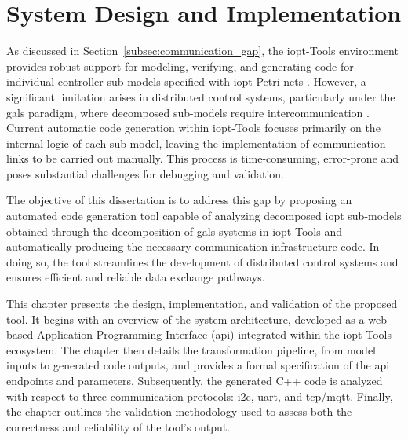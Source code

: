 
%

\chapter{System Design and Implementation}
\label{cha:chap_3}


As discussed in Section~\ref{subsec:communication_gap}, the \gls{iopt}-Tools environment provides robust support for modeling, verifying, and generating code for individual controller sub-models specified with \gls{iopt} Petri nets \cite{iopttools, barros2004, RefiningIOPT}. However, a significant limitation arises in distributed control systems, particularly under the \gls{gals} paradigm, where decomposed sub-models require intercommunication \cite{galsactd, Barrosadd}. Current automatic code generation within \gls{iopt}-Tools focuses primarily on the internal logic of each sub-model, leaving the implementation of communication links to be carried out manually. This process is time-consuming, error-prone and poses substantial challenges for debugging and validation.  

The objective of this dissertation is to address this gap by proposing an automated code generation tool capable of analyzing decomposed \gls{iopt} sub-models obtained through the decomposition of \gls{gals} systems in \gls{iopt}-Tools and automatically producing the necessary communication infrastructure code. In doing so, the tool streamlines the development of distributed control systems and ensures efficient and reliable data exchange pathways.  

This chapter presents the design, implementation, and validation of the proposed tool. It begins with an overview of the system architecture, developed as a web-based Application Programming Interface (\gls{api}) integrated within the \gls{iopt}-Tools ecosystem. The chapter then details the transformation pipeline, from model inputs to generated code outputs, and provides a formal specification of the \gls{api} endpoints and parameters. Subsequently, the generated C++ code is analyzed with respect to three communication protocols: \gls{i2c}, \gls{uart}, and \gls{tcp}/\gls{mqtt}. Finally, the chapter outlines the validation methodology used to assess both the correctness and reliability of the tool’s output.  


